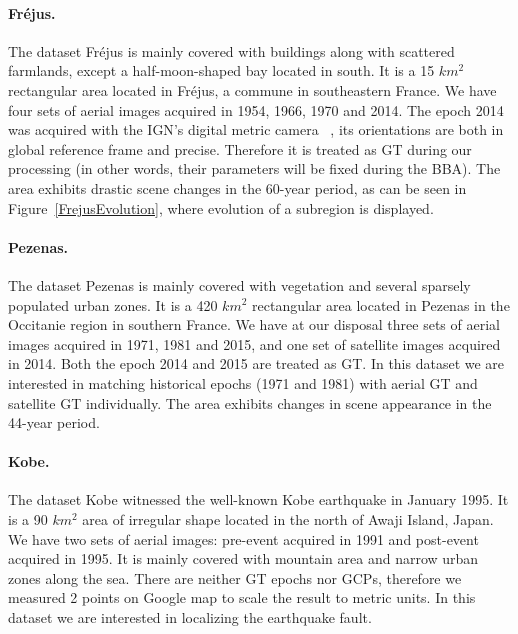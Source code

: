 
\paragraph{Fr{\'e}jus.}
The dataset Fr{\'e}jus is mainly covered with buildings along with scattered farmlands, except a half-moon-shaped bay located in south. It is a 15 $km^2$ rectangular area located in Fr{\'e}jus, a commune in southeastern France. We have four sets of aerial images acquired in 1954, 1966, 1970 and 2014. The epoch 2014 was acquired with the \ac{IGN}'s digital metric camera ~\cite{souchon2010ign}, its orientations are both in global reference frame and precise. Therefore it is treated as \ac{GT} during our processing (in other words, their parameters will be fixed during the \ac{BBA}). 
The area exhibits drastic scene changes in the 60-year period, as can be seen in Figure~\ref{FrejusEvolution}, where evolution of a subregion is displayed.\\

\paragraph{Pezenas.}
The dataset Pezenas is mainly covered with vegetation and several sparsely populated urban zones. It is a 420 $km^2$ rectangular area located in Pezenas in the Occitanie region in southern France. We have at our disposal three sets of aerial images acquired in 1971, 1981 and 2015, and one set of satellite images acquired in 2014. Both the epoch 2014 and 2015 are treated as \ac{GT}. In this dataset we are interested in matching historical epochs (1971 and 1981) with aerial \ac{GT} and satellite \ac{GT} individually. The area exhibits changes in scene appearance in the 44-year period.\\

\paragraph{Kobe.}
The dataset Kobe witnessed the well-known Kobe earthquake in January 1995. It is a 90 $km^2$ area of irregular shape located in the north of Awaji Island, Japan. We have two sets of aerial images: pre-event acquired in 1991 and post-event acquired in 1995. It is mainly covered with mountain area and narrow urban zones along the sea. There are neither \ac{GT} epochs nor \ac{GCP}s, therefore we measured 2 points on Google map to scale the result to metric units. In this dataset we are interested in localizing the earthquake fault.

